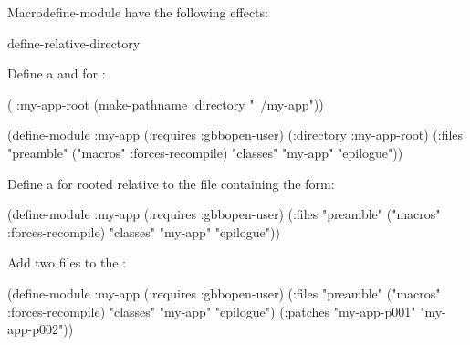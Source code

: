 \documentclass[10pt,twoside,english,pdftex]{article}
\begin{document}
\begin{functiondoc}{Macro}{define-module}{\superstar}
 have the following effects: 
%
\W\supp\tabletop
\compilemodulefileoptions

\begin{alsos}{define-relative-directory}
\also[patch]
\end{alsos}

\fnexamples {}%
Define a  and  for :
%
\W\supp
\begin{example}
  ( :my-app-root 
    (make-pathname :directory "~/my-app"))

  (define-module :my-app
    (:requires :gbbopen-user)
    (:directory :my-app-root)
    (:files "preamble"
            ("macros" :forces-recompile)
            "classes"
            "my-app"
            "epilogue"))
\end{example}

Define a  for  rooted relative to the file
containing the  form:
%
\W\supp
\begin{example}
  (define-module :my-app
    (:requires :gbbopen-user)
    (:files "preamble"
            ("macros" :forces-recompile)
            "classes"
            "my-app"
            "epilogue"))
\end{example}

Add two  files to the  :
%
\W\supp
\begin{example}
  (define-module :my-app
    (:requires :gbbopen-user)
    (:files "preamble"
            ("macros" :forces-recompile)
            "classes"
            "my-app"
            "epilogue")
    (:patches "my-app-p001"
              "my-app-p002"))
\end{example}

\end{functiondoc}

\end{document}
